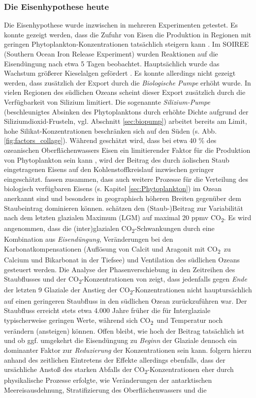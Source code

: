\documentclass[12pt,a4paper,onecolumn]{scrartcl}
\newcommand{\cotwo}{CO\textsubscript{2}}
\begin{document}
\subsubsection{Die Eisenhypothese heute}
Die Eisenhypothese wurde inzwischen in mehreren Experimenten getestet. Es konnte gezeigt werden, dass die Zufuhr von Eisen die Produktion in Regionen mit geringen Phytoplankton-Konzentrationen tatsächlich steigern kann \citep{Boyd.2007}. Im SOIREE (Southern Ocean Iron Release Experiment) wurden Reaktionen auf die Eisendüngung nach etwa 5 Tagen beobachtet. Hauptsächlich wurde das Wachstum größerer Kieselalgen gefördert \citep{Trull.2001}. Es konnte allerdings nicht gezeigt werden, dass zusätzlich der Export durch die \textit{Biologische Pumpe} erhöht wurde. In vielen Regionen des südlichen Ozeans scheint dieser Export zusätzlich durch die Verfügbarkeit von Silizium limitiert. Die sogenannte \textit{Silizium-Pumpe} (beschleunigtes Absinken des Phytoplanktons durch erhöhte Dichte aufgrund der Siliziumdioxid-Frusteln, vgl. Abschnitt \ref{sec:biopump}) arbeitet bereits am Limit, hohe Silikat-Konzentrationen beschränken sich auf den Süden (s. Abb. \ref{fig:factors_collage}). Während geschätzt wird, dass bei etwa 40 \% des ozeanischen Oberflächenwassers Eisen ein limitierender Faktor für die Produktion von Phytoplankton sein kann \citep{Emerson.2009}, wird der Beitrag des durch äolischen Staub eingetragenen Eisens auf den Kohlenstoffkreislauf inzwischen geringer eingeschätzt. \citet{Tagliabue.2017} fassen zusammen, dass auch weitere Prozesse für die Verteilung des biologisch verfügbaren Eisens (s. Kapitel \ref{sec:Phytoplankton}) im Ozean anerkannt sind und besonders in geographisch höheren Breiten gegenüber dem Staubeintrag dominieren können. \citet{Vallelonga.2013} schätzen den (Staub-)Beitrag zur Variabilität nach dem letzten glazialen Maximum (LGM) auf maximal 20 ppmv \cotwo . Es wird angenommen, dass die (inter)glazialen \cotwo -Schwankungen durch eine Kombination aus \textit{Eisendüngung}, Veränderungen bei den Karbonatkompensationen (Auflösung von Calcit und Aragonit mit  \cotwo \ zu Calcium und Bikarbonat in der Tiefsee) und Ventilation des südlichen Ozeans \citep{Lambert.2012} gesteuert werden. Die Analyse der Phasenverschiebung in den Zeitreihen des Staubflusses und der \cotwo -Konzentrationen von \citet{Lambert.2012} zeigt, dass jedenfalls gegen \textit{Ende} der letzten 9 Glaziale der Anstieg der \cotwo -Konzentrationen nicht hauptursächlich auf einen geringeren Staubfluss in den südlichen Ozean zurückzuführen war. Der Staubfluss erreicht stets etwa 4.000 Jahre früher die für Interglaziale typischerweise  geringen Werte, während sich \cotwo \ und Temperatur noch verändern (ansteigen) können. Offen bleibt, wie hoch der Beitrag tatsächlich ist und ob ggf. umgekehrt die Eisendüngung zu \textit{Beginn} der Glaziale dennoch ein dominanter Faktor zur \textit{Reduzierung} der Konzentrationen sein kann. \citet{MartinezGarcia.2009} folgern hierzu anhand des zeitlichen Eintretens der Effekte allerdings ebenfalls, dass der ursächliche Anstoß des starken Abfalls der \cotwo -Konzentrationen eher durch physikalische Prozesse erfolgte, wie Veränderungen der antarktischen Meereisausdehnung, Stratifizierung des Oberflächenwassers und die 
\end{document}
